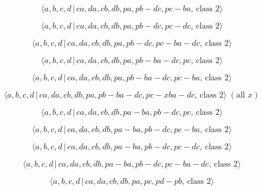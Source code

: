 \documentclass[10pt]{article}
\begin{document}
\begin{equation}
\langle a,b,c,d\,|\,ca,da,cb,db,pa,pb-dc,pc-ba,\,\text{class }2\rangle 
\tag{7.3003}
\end{equation}

\begin{equation}
\langle a,b,c,d\,|\,ca,da,cb,db,pa,pb-dc,pc-dc,\,\text{class }2\rangle 
\tag{7.3004}
\end{equation}

\begin{equation}
\langle a,b,c,d\,|\,ca,da,cb,db,pa,pb-dc,pc-ba-dc,\,\text{class }2\rangle 
\tag{7.3005}
\end{equation}

\begin{equation}
\langle a,b,c,d\,|\,ca,da,cb,db,pa,pb-ba-dc,pc,\,\text{class }2\rangle 
\tag{7.3006}
\end{equation}

\begin{equation}
\langle a,b,c,d\,|\,ca,da,cb,db,pa,pb-ba-dc,pc-ba,\,\text{class }2\rangle 
\tag{7.3007}
\end{equation}

\begin{equation}
\langle a,b,c,d\,|\,ca,da,cb,db,pa,pb-ba-dc,pc-xba-dc,\,\text{class }%
2\rangle \;(\text{all }x)  \tag{7.3008}
\end{equation}

\begin{equation}
\langle a,b,c,d\,|\,ca,da,cb,db,pa-ba,pb-dc,pc,\,\text{class }2\rangle 
\tag{7.3009}
\end{equation}

\begin{equation}
\langle a,b,c,d\,|\,ca,da,cb,db,pa-ba,pb-dc,pc-ba,\,\text{class }2\rangle 
\tag{7.3010}
\end{equation}

\begin{equation}
\langle a,b,c,d\,|\,ca,da,cb,db,pa-ba,pb-dc,pc-dc,\,\text{class }2\rangle 
\tag{7.3011}
\end{equation}

\begin{equation}
\langle a,b,c,d\,|\,ca,da,cb,db,pa-ba,pb-dc,pc-ba-dc,\,\text{class }2\rangle
\tag{7.3012}
\end{equation}

\begin{equation}
\langle a,b,c,d\,|\,ca,da,cb,db,pa,pc,pd-pb,\,\text{class }2\rangle 
\tag{7.3013}
\end{equation}
\end{document}
